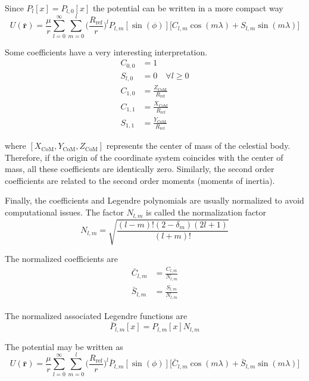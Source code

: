 Since $P_l[x] = P_{l,0}[x]$ the potential can be written in a more compact way
\begin{equation}
U(\mathbf{\bar r}) = \frac{\mu}{r} \sum_{l=0}^\infty \sum_{m=0}^l \bigg(\frac{R_{\text{ref}}}{r}\bigg)^l P_{l,m}[\sin(\phi)] \big[C_{l,m} \cos(m \lambda) + S_{l,m} \sin(m \lambda)\big]
\end{equation}

Some coefficients have a very interesting interpretation. 
\begin{align}
	C_{0,0} &= 1\\
	S_{l,0} &= 0 \quad \forall l \geq 0\\
	C_{1,0} &= \frac{Z_{\text{CoM}}}{R_{\text{ref}}}\\
	C_{1,1} &= \frac{X_{\text{CoM}}}{R_{\text{ref}}}\\
	S_{1,1} &= \frac{Y_{\text{CoM}}}{R_{\text{ref}}}
\end{align}

where $[X_\text{CoM}, Y_\text{CoM}, Z_\text{CoM}]$ represents the center of mass of the celestial body. Therefore, if the origin of the coordinate system coincides with the center of mass, all these coefficients are identically zero. Similarly, the second order coefficients are related to the second order moments (moments of inertia).

Finally, the coefficients and Legendre polynomials are usually normalized to avoid computational issues. The factor $N_{l,m}$ is called the normalization factor
\begin{equation}
N_{l,m} = \sqrt{\frac{(l-m)! (2 -\delta_m) (2 l +1)}{(l+m)!}}
\end{equation}

The normalized coefficients are
\begin{align}
	\bar C_{l,m} &= \frac{C_{l,m}}{N_{l,m}}\\
	\bar S_{l,m} &= \frac{S_{l,m}}{N_{l,m}}
\end{align}

The normalized associated Legendre functions are
\begin{equation}
\bar P_{l,m}[x] = P_{l,m}[x] N_{l,m}
\end{equation}

The potential may be written as
\begin{equation}
U(\mathbf{\bar r}) = \frac{\mu}{r} \sum_{l=0}^\infty \sum_{m=0}^l \bigg(\frac{R_{\text{ref}}}{r}\bigg)^l \bar P_{l,m}[\sin(\phi)] \big[\bar C_{l,m} \cos(m \lambda) + \bar S_{l,m} \sin(m \lambda)\big]
\end{equation}

